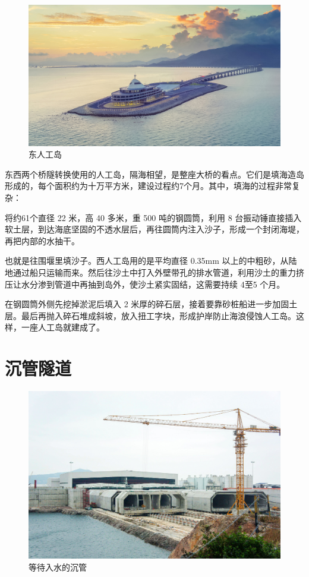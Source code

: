 \begin{multicols}{3}
\begin{figure}[H]
    \centering
    \includegraphics[width=\linewidth]{IMG/201912/East-Island.jpg}
    \caption{\kaishu 东人工岛}
    \label{fig:my_label}
\end{figure}

东西两个桥隧转换使用的人工岛，隔海相望，是整座大桥的看点。它们是填海造岛形成的，每个面积约为十万平方米，建设过程约7个月。其中，填海的过程非常复杂：


将约61个直径 22 米，高 40 多米，重 500 吨的钢圆筒，利用 8 台振动锤直接插入软土层，到达海底坚固的不透水层后，再往圆筒内注入沙子，形成一个封闭海堤，再把内部的水抽干。

也就是往围堰里填沙子。西人工岛用的是平均直径 0.35mm 以上的中粗砂，从陆地通过船只运输而来。然后往沙土中打入外壁带孔的排水管道，利用沙土的重力挤压让水分渗到管道中再抽到岛外，使沙土紧实固结，这需要持续 4至5 个月。

在钢圆筒外侧先挖掉淤泥后填入 2 米厚的碎石层，接着要靠砂桩船进一步加固土层。最后再抛入碎石堆成斜坡，放入扭工字块，形成护岸防止海浪侵蚀人工岛。这样，一座人工岛就建成了。

\section*{沉管隧道}

\begin{figure}[H]
    \centering
    \includegraphics[width=\linewidth]{IMG/201912/Tube.jpg}
    \caption{\kaishu 等待入水的沉管}
    \label{fig:my_label}
\end{figure}


\end{multicols}
